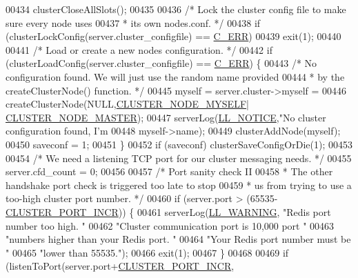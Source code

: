 \begin{DoxyCode}
{{{{{{{00434     clusterCloseAllSlots();
00435 
00436     \textcolor{comment}{/* Lock the cluster config file to make sure every node uses}
00437 \textcolor{comment}{     * its own nodes.conf. */}
00438     \textcolor{keywordflow}{if} (clusterLockConfig(server.cluster\_configfile) == \hyperlink{server_8h_af98ac28d5f4d23d7ed5985188e6fb7d1}{C\_ERR})
00439         exit(1);
00440 
00441     \textcolor{comment}{/* Load or create a new nodes configuration. */}
00442     \textcolor{keywordflow}{if} (clusterLoadConfig(server.cluster\_configfile) == \hyperlink{server_8h_af98ac28d5f4d23d7ed5985188e6fb7d1}{C\_ERR}) \{
00443         \textcolor{comment}{/* No configuration found. We will just use the random name provided}
00444 \textcolor{comment}{         * by the createClusterNode() function. */}
00445         myself = server.cluster->myself =
00446             createClusterNode(NULL,\hyperlink{cluster_8h_afee946c4e74c08465e9b4ead5e3659e6}{CLUSTER\_NODE\_MYSELF}|
      \hyperlink{cluster_8h_a5dcea846e31b55b73244aa2e496a31bf}{CLUSTER\_NODE\_MASTER});
00447         serverLog(\hyperlink{server_8h_a8c54c191e436c7dd3012167212692401}{LL\_NOTICE},\textcolor{stringliteral}{"No cluster configuration found, I'm %
00448             myself->name);
00449         clusterAddNode(myself);
00450         saveconf = 1;
00451     \}
00452     \textcolor{keywordflow}{if} (saveconf) clusterSaveConfigOrDie(1);
00453 
00454     \textcolor{comment}{/* We need a listening TCP port for our cluster messaging needs. */}
00455     server.cfd\_count = 0;
00456 
00457     \textcolor{comment}{/* Port sanity check II}
00458 \textcolor{comment}{     * The other handshake port check is triggered too late to stop}
00459 \textcolor{comment}{     * us from trying to use a too-high cluster port number. */}
00460     \textcolor{keywordflow}{if} (server.port > (65535-\hyperlink{cluster_8h_ac619a9ae48ab1431daa590fb5e75cea8}{CLUSTER\_PORT\_INCR})) \{
00461         serverLog(\hyperlink{server_8h_a31229b9334bba7d6be2a72970967a14b}{LL\_WARNING}, \textcolor{stringliteral}{"Redis port number too high. "}
00462                    \textcolor{stringliteral}{"Cluster communication port is 10,000 port "}
00463                    \textcolor{stringliteral}{"numbers higher than your Redis port. "}
00464                    \textcolor{stringliteral}{"Your Redis port number must be "}
00465                    \textcolor{stringliteral}{"lower than 55535."});
00466         exit(1);
00467     \}
00468 
00469     \textcolor{keywordflow}{if} (listenToPort(server.port+\hyperlink{cluster_8h_ac619a9ae48ab1431daa590fb5e75cea8}{CLUSTER\_PORT\_INCR},
}}}}}}}}
\end{DoxyCode}
